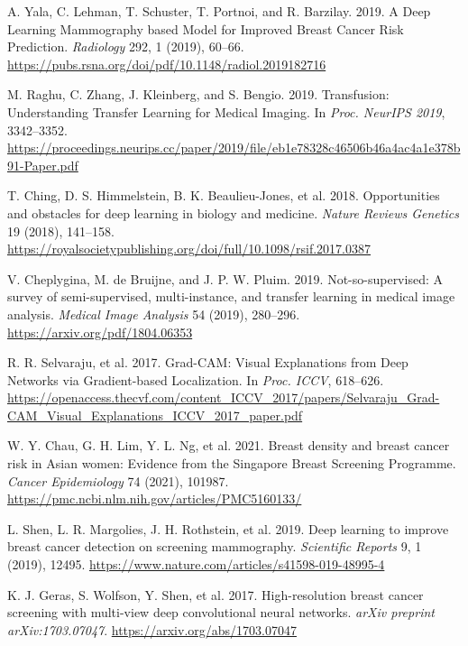 \documentclass[12pt]{article}
\begin{document}
\begin{thebibliography}{99}

    A. Yala, C. Lehman, T. Schuster, T. Portnoi, and R. Barzilay. 2019. A Deep Learning Mammography based Model for Improved Breast Cancer Risk Prediction. \textit{Radiology} 292, 1 (2019), 60–66. \url{https://pubs.rsna.org/doi/pdf/10.1148/radiol.2019182716}
    
    M. Raghu, C. Zhang, J. Kleinberg, and S. Bengio. 2019. Transfusion: Understanding Transfer Learning for Medical Imaging. In \textit{Proc. NeurIPS 2019}, 3342–3352. \url{https://proceedings.neurips.cc/paper/2019/file/eb1e78328c46506b46a4ac4a1e378b91-Paper.pdf}
    
    T. Ching, D. S. Himmelstein, B. K. Beaulieu-Jones, et al. 2018. Opportunities and obstacles for deep learning in biology and medicine. \textit{Nature Reviews Genetics} 19 (2018), 141–158. \url{https://royalsocietypublishing.org/doi/full/10.1098/rsif.2017.0387}
    
    V. Cheplygina, M. de Bruijne, and J. P. W. Pluim. 2019. Not-so-supervised: A survey of semi-supervised, multi-instance, and transfer learning in medical image analysis. \textit{Medical Image Analysis} 54 (2019), 280–296. \url{https://arxiv.org/pdf/1804.06353}
    
    R. R. Selvaraju, et al. 2017. Grad-CAM: Visual Explanations from Deep Networks via Gradient-based Localization. In \textit{Proc. ICCV}, 618–626. \url{https://openaccess.thecvf.com/content_ICCV_2017/papers/Selvaraju_Grad-CAM_Visual_Explanations_ICCV_2017_paper.pdf}
    
    W. Y. Chau, G. H. Lim, Y. L. Ng, et al. 2021. Breast density and breast cancer risk in Asian women: Evidence from the Singapore Breast Screening Programme. \textit{Cancer Epidemiology} 74 (2021), 101987. \url{https://pmc.ncbi.nlm.nih.gov/articles/PMC5160133/}
    
    L. Shen, L. R. Margolies, J. H. Rothstein, et al. 2019. Deep learning to improve breast cancer detection on screening mammography. \textit{Scientific Reports} 9, 1 (2019), 12495. \url{https://www.nature.com/articles/s41598-019-48995-4}
    
    K. J. Geras, S. Wolfson, Y. Shen, et al. 2017. High-resolution breast cancer screening with multi-view deep convolutional neural networks. \textit{arXiv preprint arXiv:1703.07047}. \url{https://arxiv.org/abs/1703.07047}
    

\end{thebibliography}
\end{document}
